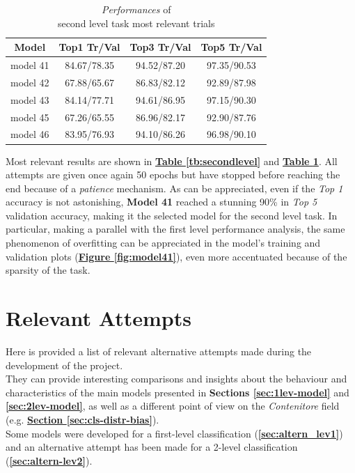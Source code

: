 \documentclass[12pt]{article}
\begin{document}
\begin{table}[h!]
	    \centering
	    \scriptsize
	    \begin{tabular}{ |c|c|c|c| }
        \hline
        \textbf{Model} & \textbf{Top1 Tr/Val} & \textbf{Top3 Tr/Val} & \textbf{Top5 Tr/Val}\\
        \hline
        model 41 & 84.67/78.35 & 94.52/87.20 & 97.35/90.53 \\
        model 42 & 67.88/65.67 & 86.83/82.12 & 92.89/87.98 \\
        model 43 & 84.14/77.71 & 94.61/86.95 & 97.15/90.30 \\
        model 45 & 67.26/65.55 & 86.96/82.17 & 92.90/87.76 \\
        model 46 & 83.95/76.93 & 94.10/86.26 & 96.98/90.10 \\
        \hline
        \end{tabular}
        \captionsetup{justification   = centering}
	    \caption{\textit{Performances} of \\second level task most relevant trials}
        \label{tb:secondlevelacc}
\end{table}

Most relevant results are shown in \hyperref[tb:secondlevel]{\textbf{Table \ref{tb:secondlevel}}} and \hyperref[tb:secondlevelacc]{\textbf{Table \ref{tb:secondlevelacc}}}. All attempts are given once again 50 epochs but have stopped before reaching the end because of a \textit{patience} mechanism.
\newline\newline
As can be appreciated, even if the \textit{Top 1} accuracy is not astonishing, \textbf{Model 41} reached a stunning 90\% in \textit{Top 5} validation accuracy, making it the selected model for the second level task.  In particular, making a parallel with the first level performance analysis, the same phenomenon of overfitting can be appreciated in the model's training and validation plots (\hyperref[fig:model41]{\textbf{Figure \ref{fig:model41}}}), even more accentuated because of the sparsity of the task.


\section{Relevant Attempts}
Here is provided a list of relevant alternative attempts made during the development of the project.\\
They can provide interesting comparisons and insights about the behaviour and characteristics of the main models presented in \textbf{Sections \ref{sec:1lev-model}} and \textbf{\ref{sec:2lev-model}}, as well as a different point of view on the \textit{Contenitore} field (e.g. \hyperref[sec:cls-distr-bias]{\textbf{Section \ref{sec:cls-distr-bias}}}).\\
Some models were developed for a first-level classification (\textbf{\ref{sec:altern_lev1}}) and an alternative attempt has been made for a 2-level classification (\textbf{\ref{sec:altern-lev2}}).
\end{document}
